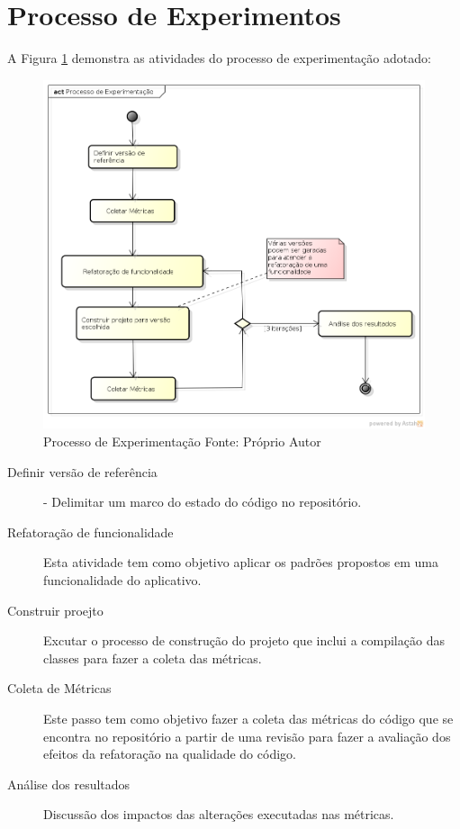 \section{Processo de Experimentos}


A Figura \ref{processo_experimentacao} demonstra as atividades do processo de
experimentação adotado:
\begin{figure}[!h]
	\centering
	\includegraphics[scale=0.5]{img/processo_experimentacao.png}
	\caption{Processo de Experimentação Fonte: Próprio Autor}
	\label{processo_experimentacao}
\end{figure}

\begin{description}
\item[Definir versão de referência] - Delimitar um marco do estado do código no
repositório.
\item[Refatoração de funcionalidade] Esta atividade tem como objetivo aplicar os
padrões propostos em uma funcionalidade do aplicativo.
\item[Construir proejto] Excutar o processo de construção do projeto que inclui
a compilação das classes para fazer a coleta das métricas.
\item[Coleta de Métricas] Este passo tem como objetivo fazer a coleta
das métricas do código que se encontra no repositório a partir de uma revisão
para fazer a avaliação dos efeitos da refatoração na qualidade do código.
\item[Análise dos resultados] Discussão dos impactos das alterações executadas
nas métricas.
\end{description}